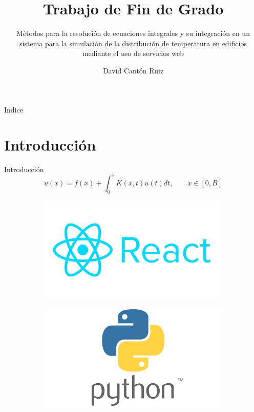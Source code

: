 \documentclass{beamer}
\title{Trabajo de Fin de Grado}
\subtitle{Métodos para la resolución de
	ecuaciones integrales y su
	integración en un sistema
	para la simulación de la
	distribución de temperatura
	en edificios mediante el uso
	de servicios web}
\author{David Cantón Ruiz}
\institute{Universidad de Granada}
\begin{document}
\begin{frame}[plain]
    \maketitle
\end{frame}
\begin{frame}{Indice}
	\tableofcontents
\end{frame}
\section{Introducción}
\begin{frame}{Introducción}
	\begin{equation*}
		u(x) = f(x) + \int_0^x K(x,t)u(t)dt, \qquad x \in [0,B]
	\end{equation*}
	\begin{figure}
		\centering
		\begin{subfigure}[t]{0.3\textwidth}
			\includegraphics[width=\textwidth]{react}
		\end{subfigure}
		\begin{subfigure}[b]{0.3\textwidth}
			\includegraphics[width=\textwidth]{python}

\end{subfigure}
\end{figure}
\end{frame}
\end{document}
